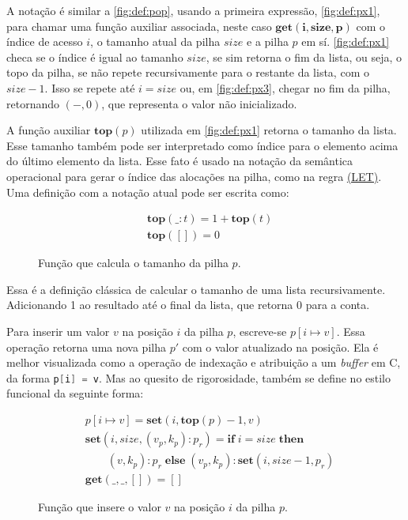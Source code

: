A notação é similar a \ref{fig:def:pop}, usando a primeira expressão, \ref{fig:def:px1}, para chamar uma função auxiliar associada, neste caso $\mathbf{get(i, size, p)}$ com o índice de acesso $i$, o tamanho atual da pilha $size$ e a pilha $p$ em sí. \ref{fig:def:px1} checa se o índice é igual ao tamanho $size$, se sim retorna o fim da lista, ou seja, o topo da pilha, se não repete recursivamente para o restante da lista, com o $size - 1$. Isso se repete até $i = size$ ou, em \ref{fig:def:px3}, chegar no fim da pilha, retornando $(-,0)$, que representa o valor não inicializado.

A função auxiliar $\mathbf{top}(p)$ utilizada em \ref{fig:def:px1} retorna o tamanho da lista. Esse tamanho também pode ser interpretado como índice para o elemento acima do último elemento da lista. Esse fato é usado na notação da semântica operacional para gerar o índice das alocações na pilha, como na regra \hyperref[rule:let]{(LET)}. Uma definição com a notação atual pode ser escrita como:

\begin{figure}[ht]
	\begin{align}
	&\mathbf{top}(\_ : t) = 1 + \mathbf{top}(t) \label{fig:def:top1}\\
	&\mathbf{top}([]) = 0 \label{fig:def:top2}
	\end{align}
	\caption{Função que calcula o tamanho da pilha $p$.}
	\label{fig:def:top}
\end{figure}

Essa é a definição clássica de calcular o tamanho de uma lista recursivamente. Adicionando 1 ao resultado até o final da lista, que retorna 0 para a conta.

Para inserir um valor $v$ na posição $i$ da pilha $p$, escreve-se $p[i \mapsto v]$. Essa operação retorna uma nova pilha $p'$ com o valor atualizado na posição. Ela é melhor visualizada como a operação de indexação e atribuição a um \emph{buffer} em C, da forma \lstinline[language=C]|p[i] = v|. Mas ao quesito de rigorosidade, também se define no estilo funcional da seguinte forma:

\begin{figure}[ht]
	\begin{align}
	&p[i \mapsto v] = \mathbf{set}(i, \mathbf{top}(p) - 1, v) \label{fig:def:set1}\\
	&\mathbf{set}(i, size, (v_p, k_p) : p_r) = \mathbf{if}\;i = size \;\mathbf{then} \nonumber\\ 
	&\quad\quad(v, k_p) : p_r\;\mathbf{else}\;(v_p, k_p) : \mathbf{set}(i, size - 1, p_r) \label{fig:def:set2}\\
	&\mathbf{get}(\_, \_, []) = [] \label{fig:def:set3}
	\end{align}
	\caption{Função que insere o valor $v$ na posição $i$ da pilha $p$.}
	\label{fig:def:set}
\end{figure}

